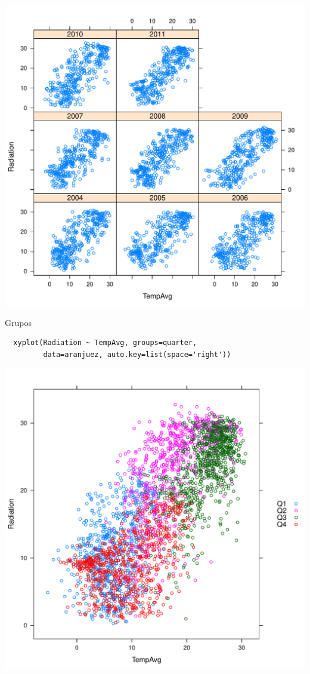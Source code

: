 \documentclass[xcolor={usenames,svgnames,dvipsnames}]{beamer}
\begin{document}
\begin{frame}[label=sec-2-1-11]{}
\includegraphics[width=.9\linewidth]{figs/xyplotYear.pdf}
\end{frame}

\begin{frame}[fragile,label=sec-2-1-12]{Grupos}
 \lstset{language=R,label= ,caption= ,numbers=none}
\begin{lstlisting}
  xyplot(Radiation ~ TempAvg, groups=quarter,
         data=aranjuez, auto.key=list(space='right'))
\end{lstlisting}
\end{frame}

\begin{frame}[label=sec-2-1-13]{}
\includegraphics[width=.9\linewidth]{figs/xyplotQuarter.pdf}
\end{frame}
\end{document}
